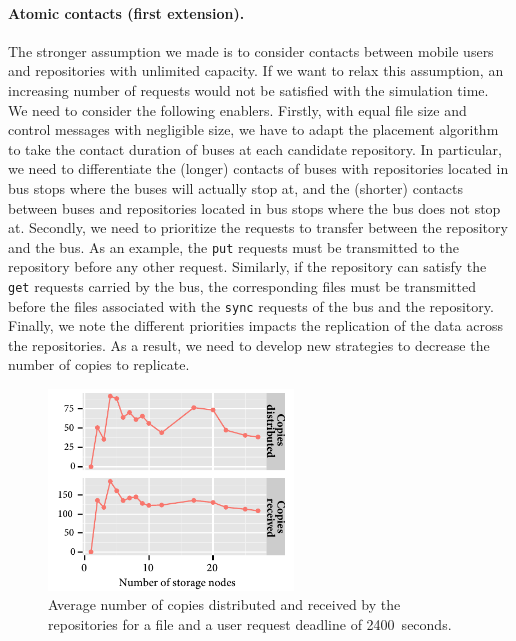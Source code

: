 \paragraph{Atomic contacts (first extension).}
The stronger assumption we made is to consider contacts between mobile users and repositories with unlimited capacity. If we want to relax this assumption, an increasing number of requests would not be satisfied with the simulation time. We need to consider the following enablers. Firstly, with equal file size and control messages with negligible size, we have to adapt the placement algorithm to take the contact duration of buses at each candidate repository. In particular, we need to differentiate the (longer) contacts of buses with repositories located in bus stops where the buses will actually stop at, and the (shorter) contacts between buses and repositories located in bus stops where the bus does not stop at. Secondly, we need to prioritize the requests to transfer between the repository and the bus. As an example, the \texttt{put} requests must be transmitted to the repository before any other request. Similarly, if the repository can satisfy the \texttt{get} requests carried by the bus, the corresponding files must be transmitted before the files associated with the \texttt{sync} requests of the bus and the repository. Finally, we note the different priorities impacts the replication of the data across the repositories. As a result, we need to develop new strategies to decrease the number of copies to replicate. 

\begin{figure}
    \vspace{-15pt}
    \centering
    \includegraphics[width=6.5cm]{figures/allput-backend.pdf}
    \caption{Average number of copies distributed and received by the repositories for a file and a user request deadline of 2400~seconds.}
    \label{fig:allput-backend}
\end{figure}
